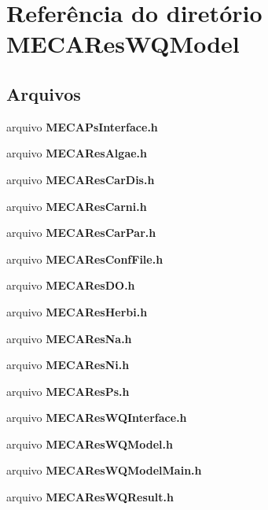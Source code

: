 \section{Referência do diretório M\+E\+C\+A\+Res\+W\+Q\+Model}
\label{dir_e6bf52a9178057813a43a63b5aaa9b07}
\subsection*{Arquivos}
\begin{DoxyCompactItemize}
\item 
arquivo {\bf M\+E\+C\+A\+Ps\+Interface.\+h}
\item 
arquivo {\bf M\+E\+C\+A\+Res\+Algae.\+h}
\item 
arquivo {\bf M\+E\+C\+A\+Res\+Car\+Dis.\+h}
\item 
arquivo {\bf M\+E\+C\+A\+Res\+Carni.\+h}
\item 
arquivo {\bf M\+E\+C\+A\+Res\+Car\+Par.\+h}
\item 
arquivo {\bf M\+E\+C\+A\+Res\+Conf\+File.\+h}
\item 
arquivo {\bf M\+E\+C\+A\+Res\+D\+O.\+h}
\item 
arquivo {\bf M\+E\+C\+A\+Res\+Herbi.\+h}
\item 
arquivo {\bf M\+E\+C\+A\+Res\+Na.\+h}
\item 
arquivo {\bf M\+E\+C\+A\+Res\+Ni.\+h}
\item 
arquivo {\bf M\+E\+C\+A\+Res\+Ps.\+h}
\item 
arquivo {\bf M\+E\+C\+A\+Res\+W\+Q\+Interface.\+h}
\item 
arquivo {\bf M\+E\+C\+A\+Res\+W\+Q\+Model.\+h}
\item 
arquivo {\bf M\+E\+C\+A\+Res\+W\+Q\+Model\+Main.\+h}
\item 
arquivo {\bf M\+E\+C\+A\+Res\+W\+Q\+Result.\+h}
\end{DoxyCompactItemize}
